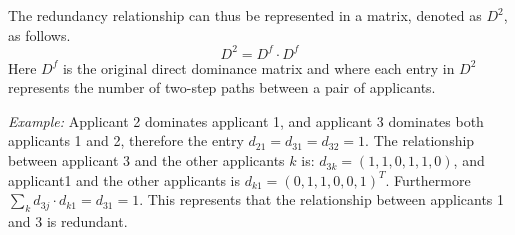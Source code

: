 \documentclass[12pt,english]{report}
\begin{document}
The redundancy relationship can thus  be represented in a matrix, denoted as $D^2$,  as follows. $$D^2 = D^{f} \cdot D^{f} $$  Here $D^f$ is the original direct dominance matrix and where each entry in $D^2$ represents the number of two-step paths between a pair of applicants. 
 
\textit{Example:} Applicant 2 dominates applicant 1, and applicant 3 dominates both applicants 1 and 2, therefore the entry $d_{21}=d_{31}=d_{32}=1$. The relationship between applicant 3 and the other applicants $k$ is: $d_{3k}=(1,1,0,1,1,0)$, and applicant1 and the other applicants is $d_{k1}=(0,1,1,0,0,1) ^T $. Furthermore $\sum_k d_{3j} \cdot d_{k1}=d_{31}=1$. This represents that the relationship between applicants 1 and 3 is redundant. 


\begin{figure}
\begin{floatrow}
\capbtabbox{%
	\begin{tabular}{l|llllll}
		& 1 & 2 & 3 & 4 & 5 & 6 \\ \hline
		1 & 0 & 0 & 0 & 0 & 0 & 0 \\
		2 & 0 & 0 & 0 & 0 & 0 & 0 \\
		3 & 1 & 0 & 0 & 1 & 1 & 0 \\
		4 & 0 & 0 & 0 & 0 & 0 & 0 \\
		5 & 0 & 0 & 0 & 0 & 0 & 0 \\
		6 & 1 & 1 & 0 & 1 & 1 & 0 \\
	\end{tabular}
	\label{domin_matrix2}%
}{%
\caption{Redundant Dominance Relation in Matrix}%
\label{redundant1}
}
\end{floatrow}
\end{figure}
\end{document}
